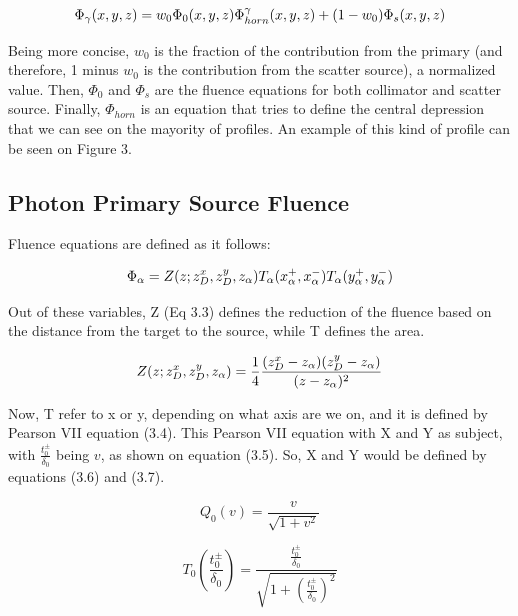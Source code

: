 \documentclass[openany]{article}
\begin{document}
\begin{equation}
    \centering
    \Phi_\gamma (x,y,z) = w_0 \Phi_0(x,y,z) \Phi_{horn}^\gamma (x,y,z) + (1-w_0)\Phi_s(x,y,z) 
\end{equation}



Being more concise, \(w_0\) is the fraction of the contribution from the primary (and therefore, 1 minus \(w_0\) is the contribution from the scatter source), a normalized value. Then, \(\Phi_0\) and \(\Phi_s\) are the fluence equations for both collimator and scatter source. Finally, \(\Phi_{horn}\) is an equation that tries to define the central depression that we can see on the mayority of profiles. An example of this kind of profile can be seen on Figure 3.\\



\subsection{Photon Primary Source Fluence}

Fluence equations are defined as it follows:

\begin{equation}
    \centering 
    \Phi_\alpha = Z(z; z_D^x, z_D^y, z_\alpha) T_\alpha(x_\alpha^+, x_\alpha^-) T_\alpha(y_\alpha^+, y_\alpha^- )
    
\end{equation}

Out of these variables, Z (Eq 3.3) defines the reduction of the fluence based on the distance from the target to the source, while T defines the area. 

\begin{equation}
    \centering 
    Z(z; z^x_D, z^y_D, z_\alpha) = \frac{1}{4} \frac{(z_D^x - z_\alpha) (z^y_D - z_\alpha )}{(z-z_\alpha)^2}
    
\end{equation}

Now, T refer to x or y, depending on what axis are we on, and it is defined by Pearson VII equation (3.4). This Pearson VII equation with X and Y as subject, with \( \frac{t_0^\pm}{\delta_0}\) being \(v\), as shown on equation (3.5). So, X and Y would be defined by equations (3.6) and (3.7). 

\begin{equation}
    Q_0(v) = \frac{v}{\sqrt{1+v^2}} 
\end{equation}

\begin{equation}
    T_0 (\frac{t_0^\pm}{\delta_0}) = \frac{\frac{t_0^\pm}{\delta_0}}{\sqrt{1 + (\frac{t_0^\pm}{\delta_0})^2}}
\end{equation}
\end{document}
